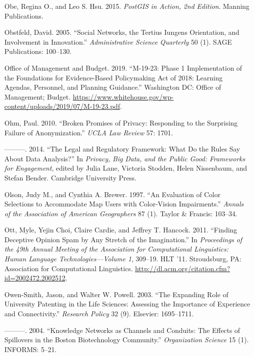\documentclass[]{krantz}
\begin{document}
\hypertarget{ref-PostGISInAction}{}
Obe, Regina O., and Leo S. Hsu. 2015. \emph{PostGIS in Action, 2nd
Edition}. Manning Publications.

\hypertarget{ref-obstfeld2005social}{}
Obstfeld, David. 2005. ``Social Networks, the Tertius Iungens
Orientation, and Involvement in Innovation.'' \emph{Administrative
Science Quarterly} 50 (1). SAGE Publications: 100--130.

\hypertarget{ref-OfficeofManagementandBudget}{}
Office of Management and Budget. 2019. ``M-19-23: Phase 1 Implementation
of the Foundations for Evidence-Based Policymaking Act of 2018: Learning
Agendas, Personnel, and Planning Guidance.'' Washington DC: Office of
Management; Budget.
\url{https://www.whitehouse.gov/wp-content/uploads/2019/07/M-19-23.pdf}.

\hypertarget{ref-ohm2010broken}{}
Ohm, Paul. 2010. ``Broken Promises of Privacy: Responding to the
Surprising Failure of Anonymization.'' \emph{UCLA Law Review} 57: 1701.

\hypertarget{ref-Ohm2014}{}
---------. 2014. ``The Legal and Regulatory Framework: What Do the Rules
Say About Data Analysis?'' In \emph{Privacy, Big Data, and the Public
Good: Frameworks for Engagement}, edited by Julia Lane, Victoria
Stodden, Helen Nissenbaum, and Stefan Bender. Cambridge University
Press.

\hypertarget{ref-olson1997evaluation}{}
Olson, Judy M., and Cynthia A. Brewer. 1997. ``An Evaluation of Color
Selections to Accommodate Map Users with Color-Vision Impairments.''
\emph{Annals of the Association of American Geographers} 87 (1). Taylor
\& Francis: 103--34.

\hypertarget{ref-ott-11}{}
Ott, Myle, Yejin Choi, Claire Cardie, and Jeffrey T. Hancock. 2011.
``Finding Deceptive Opinion Spam by Any Stretch of the Imagination.'' In
\emph{Proceedings of the 49th Annual Meeting of the Association for
Computational Linguistics: Human Language Technologies---Volume 1},
309--19. HLT '11. Stroudsburg, PA: Association for Computational
Linguistics. \url{http://dl.acm.org/citation.cfm?id=2002472.2002512}.

\hypertarget{ref-owen2003expanding}{}
Owen-Smith, Jason, and Walter W. Powell. 2003. ``The Expanding Role of
University Patenting in the Life Sciences: Assessing the Importance of
Experience and Connectivity.'' \emph{Research Policy} 32 (9). Elsevier:
1695--1711.

\hypertarget{ref-owen2004knowledge}{}
---------. 2004. ``Knowledge Networks as Channels and Conduits: The
Effects of Spillovers in the Boston Biotechnology Community.''
\emph{Organization Science} 15 (1). INFORMS: 5--21.
\end{document}
